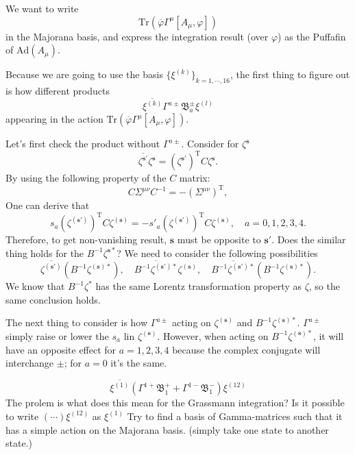 
We want to write
\[
	\mathrm{Tr} \left( \overline{\varphi} \Gamma^\mu [A_\mu,\varphi] \right) 
\] 
in the Majorana basis,
and express the integration result (over $\varphi$)
as the Puffafin of $\mathrm{Ad}(A_\mu)$.

Because we are going to use the basis $\{\xi^{(k)}\}_{k=1,\cdots,16}$,
the first thing to figure out is how different products
\[
	\overline{\xi^{(k)}} \Gamma^{a\pm} \mathfrak{B}_a^{\pm} \xi^{(l)}
\] 
appearing in the action $\mathrm{Tr} \left( \overline{\varphi} \Gamma^\mu [A_\mu,\varphi] \right) $.

Let's first check the product without $\Gamma^{a\pm}$.
Consider for $\zeta^{\mathbf{s}}$
\[
	\overline{\zeta^{\mathbf{s}'}} \zeta^{\mathbf{s}}
		= (\zeta^{\mathbf{s}'})^{\text{T}} C \zeta^{\mathbf{s}}
.\] 
By using the following property of the $C$ matrix:
		\[
				C \Sigma^{\mu\nu} C^{-1} = - (\Sigma^{\mu\nu})^{\text{T}}
			,\] 
One can derive that
\[
					s_a (\zeta^{(\mathbf{s}')})^{\text{T}} C \zeta^{(\mathbf{s})}
						= - s'_a (\zeta^{(\mathbf{s}')})^{\text{T}} C \zeta^{(\mathbf{s})}
						,\quad a=0,1,2,3,4
					.\] 
					Therefore, to get non-vanishing result, 
					$\mathbf{s}$ must be opposite to $\mathbf{s}'$.
Does the similar thing holds for the $B^{-1} \zeta^{\mathbf{s}*}$?
We need to consider the following possibilities
\[
	\overline{\zeta^{(\mathbf{s}')}} (B^{-1} \zeta^{(\mathbf{s})*}),\quad
	\overline{B^{-1} \zeta^{(\mathbf{s}')*}} \zeta^{(\mathbf{s})},\quad
	\overline{B^{-1} \zeta^{(\mathbf{s}')*}} 
	(B^{-1} \zeta^{(\mathbf{s})*})
.\] 
We know that $B^{-1} \zeta^*$ has the same Lorentz transformation property as $\zeta$,
so the same conclusion holds.

The next thing to consider is how $\Gamma^{a\pm}$ acting on $\zeta^{(\mathbf{s})}$ and $B^{-1} \zeta^{(\mathbf{s})*}$.
$\Gamma^{a\pm}$ simply raise or lower the $s_a$ lin $\zeta^{(\mathbf{s})}$.
However, when acting on $B^{-1} \zeta^{(\mathbf{s})*}$,
it will have an opposite effect for $a=1,2,3,4$
because the complex conjugate will interchange $\pm$;
for $a=0$ it's the same.

\begin{correct}
	\begin{equation}
		\overline{\xi^{(1)}} (\Gamma^{1+} \mathfrak{B}_1^+
		+ \Gamma^{1-} \mathfrak{B}_1^- )\xi^{(12)}
	\end{equation}
	The prolem is what does this mean for the Grassmann integration?
	Is it possible to write $(\cdots)\xi^{(12)}$ as $\xi^{(1)}$
	Try to find a basis of Gamma-matrices such that it has a simple action on the Majorana basis. (simply take one state to another state.)
\end{correct}


